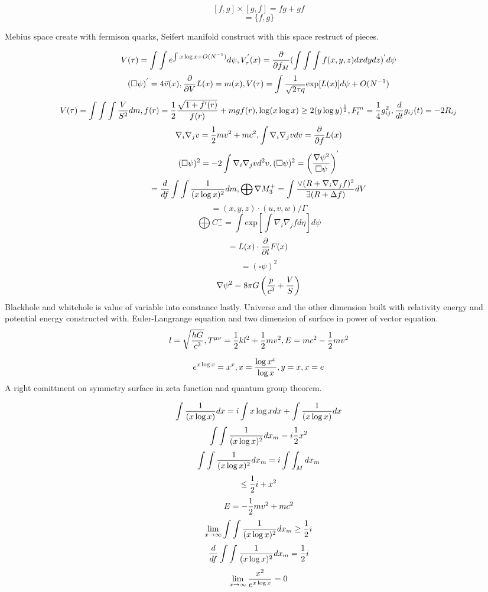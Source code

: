 \documentclass{jsarticle}
\begin{document}
{$$ [f,g] \times [g,f] = fg + gf $$
$$ = \{f,g\} $$

  Mebius space create with fermison quarks, Seifert manifold construct with this space restruct of pieces.


  $$ V(\tau) = \int \int e^{\int x \log x + O(N^{-1})}d \psi, V^{'}_{\tau}(x) = {\partial \over \partial f_M}(\int \int \int
	  f(x,y,z)dxdydz)^{'}d \psi $$
	  $$ (\square \psi)^{'} = 4 \vec{v}(x), {\partial \over \partial V}L(x) = m(x), V(\tau) = \int {1 \over \sqrt{2 \tau q}}\mathrm{exp}[L(x)]d \psi + O(N^{-1}) $$
	  $$ V(\tau) = \int \int \int {V \over S^2}dm, f(r) = {1 \over 2}{\sqrt{1 + f'(r)} \over f(r)} + mgf(r), \log (x \log x) \ge 2 (y \log y)^{1 \over 2}, F^m_t = 
	  {1 \over 4}g^2_{ij}, {d \over dt}g_{ij}(t) = - 2 R_{ij} $$
	  $$ \nabla_{i}\nabla_{j} v = {1 \over 2}mv^2 + mc^2, \int \nabla_{i}\nabla_{j} v dv = {\partial \over \partial f}L(x) $$
	  $$ (\square \psi)^2 = -2 \int \nabla_{i}\nabla_{j}v d^2v, (\square \psi)^2 = \left({\nabla \psi^2 \over \square \psi}\right)^{'} $$
  $$ = {d \over df}\int \int {1 \over (x \log x)^2}dm, \bigoplus \nabla M^{+}_3 = \int{\vee(R + \nabla_{i}\nabla_{j} f)^2 \over \exists(R+ \Delta f)}dV $$
  $$ = (x,y,z)\cdot (u,v,w)/ \Gamma $$
  $$ \bigoplus C^{+}_{-} = \int \mathrm{exp}[\int \nabla_{i}\nabla_{j} f d \eta]d \psi $$
  $$ = L(x) \cdot {\partial \over \partial l}F(x) $$
  $$ = (\square \psi)^2 $$
  $$ \nabla \psi^2 = 8 \pi G\left({p \over c^3} + {V \over S}\right)$$
  Blackhole and whitehole is value of variable into constance lastly.
  Universe and the other dimension built with relativity energy and potential energy constructed with.
  Euler-Langrange equation and two dimension of surface in power of vector equation.
  $$ l = \sqrt{{h G \over c^3}}, T^{\mu\nu} = {1 \over 2}kl^2 + {1 \over 2}mv^2, E = mc^2 - {1 \over 2}mv^2 $$

  $$ e^{x \log x} = x^x, x = {\log x^x \over \log x}, y = x, x = e $$
  A right comittment on symmetry surface in zeta function and quantum group theorem.

  $$ \int {1 \over (x \log x)}dx = i \int x \log x dx + \int {1 \over (x \log x)}dx $$
  $$ \int \int {1 \over (x \log x)^2}dx_m = i {1 \over 2}x^2 $$
  $$ \int \int {1 \over (x \log x)^2}dx_m = i \int \int_M  dx_m $$
  $$ \le {1 \over 2}i + x^2 $$
  $$ E = - {1 \over 2}mv^2 + mc^2 $$
  $$ \lim_{x \to \infty} \int \int {1 \over (x \log x)^2}dx_m \ge {1 \over 2}i $$
  $$ {d \over df} \int \int {1 \over (x \log x)^2}dx_m = {1 \over 2}i $$
  $$ \lim_{x \to \infty}{x^2 \over e^{x \log x}} = 0 $$

}
\end{document}
